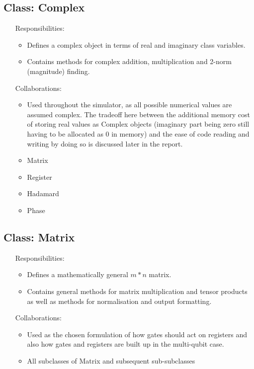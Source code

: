 \documentclass[12pt]{report}
\begin{document}
\subsection{Class: Complex}
\label{sec:Complex}
\begin{itemize}
	\item [Responsibilities:]
	\begin{itemize}
		\item Defines a complex object in terms of real and imaginary class variables. 
		\item Contains methods for complex addition, multiplication and 2-norm (magnitude) finding.
	\end{itemize}
	\item [Collaborations:]
	\begin{itemize}
		\item Used throughout the simulator, as all possible numerical values are assumed complex.  The tradeoff here between the additional memory cost of storing real values as Complex objects (imaginary part being zero still having to be allocated as 0 in memory) and the ease of code reading and writing by doing so is discussed later in the report.
		\item Matrix
		\item Register
		\item Hadamard
		\item Phase
	\end{itemize}
\end{itemize}
\subsection{Class: Matrix}
\label{sec:Matrix}
\begin{itemize}
	\item [Responsibilities:]
	\begin{itemize}
		\item Defines a mathematically general $m*n$ matrix.
		\item Contains general methods for matrix multiplication and tensor products as well as methods for normalisation and output formatting.
	\end{itemize}
	\item [Collaborations:]
		\begin{itemize}
		\item Used as the chosen formulation of how gates should act on registers and also how gates and registers are built up in the multi-qubit case.
		\item All subclasses of Matrix and subsequent sub-subclasses
	\end{itemize}
\end{itemize}
\end{document}
